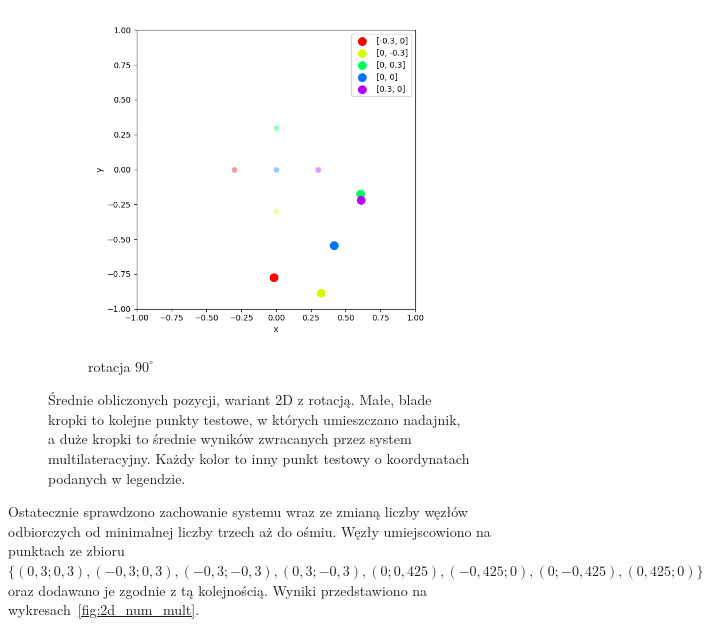 \begin{figure}[H]
    \ContinuedFloat\centering
    \begin{subfigure}{.5\textwidth}
        \centering
        \includegraphics[width=\linewidth]{pics/mult_lat_2d_angle/positions_90_mean.png}
        \caption{rotacja $90^{\circ}$}
        \label{pic:2d_90_angle_mult}
    \end{subfigure}
    \caption[Wyniki eksperymentu dla wersji 2D z rotacją]{Średnie obliczonych pozycji, wariant 2D z rotacją. Małe, blade kropki to kolejne punkty testowe, w których umieszczano nadajnik, a duże kropki to średnie wyników zwracanych przez system multilateracyjny. Każdy kolor to inny punkt testowy o koordynatach podanych w legendzie.}
    \label{fig:2d_angle_mult}
\end{figure}

Ostatecznie sprawdzono zachowanie systemu wraz ze zmianą liczby węzłów odbiorczych od minimalnej liczby trzech aż do ośmiu. Węzły umiejscowiono na punktach ze zbioru $\{(0,3;0,3), (-0,3;0,3), (-0,3;-0,3), (0,3;-0,3), (0; 0,425), (-0,425; 0), (0; -0,425), (0,425; 0)\}$ oraz dodawano je zgodnie z tą kolejnością. Wyniki przedstawiono na wykresach~\ref{fig:2d_num_mult}. 

